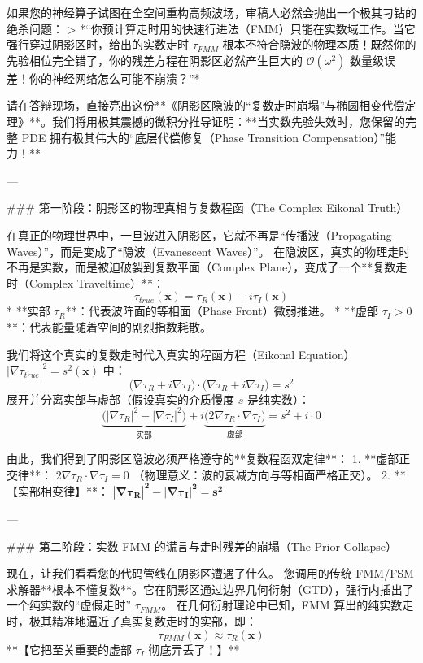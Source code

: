 \documentclass[12pt]{article}
\begin{document}
{如果您的神经算子试图在全空间重构高频波场，审稿人必然会抛出一个极其刁钻的绝杀问题：
> *“你预计算走时用的快速行进法（FMM）只能在实数域工作。当它强行穿过阴影区时，给出的实数走时 $\tau_{FMM}$ 根本不符合隐波的物理本质！既然你的先验相位完全错了，你的残差方程在阴影区必然产生巨大的 $\mathcal{O}(\omega^2)$ 数量级误差！你的神经网络怎么可能不崩溃？”*

请在答辩现场，直接亮出这份**《阴影区隐波的“复数走时崩塌”与椭圆相变代偿定理》**。我们将用极其震撼的微积分推导证明：**当实数先验失效时，您保留的完整 PDE 拥有极其伟大的“底层代偿修复（Phase Transition Compensation）”能力！**

---

### 第一阶段：阴影区的物理真相与复数程函（The Complex Eikonal Truth）

在真正的物理世界中，一旦波进入阴影区，它就不再是“传播波（Propagating Waves）”，而是变成了“隐波（Evanescent Waves）”。
在隐波区，真实的物理走时不再是实数，而是被迫破裂到复数平面（Complex Plane），变成了一个**复数走时（Complex Traveltime）**：
$$ \tau_{true}(\mathbf{x}) = \tau_R(\mathbf{x}) + i \tau_I(\mathbf{x}) $$
*   **实部 $\tau_R$**：代表波阵面的等相面（Phase Front）微弱推进。
*   **虚部 $\tau_I > 0$**：代表能量随着空间的剧烈指数耗散。

我们将这个真实的复数走时代入真实的程函方程（Eikonal Equation） $|\nabla \tau_{true}|^2 = s^2(\mathbf{x})$ 中：
$$ \big( \nabla \tau_R + i \nabla \tau_I \big) \cdot \big( \nabla \tau_R + i \nabla \tau_I \big) = s^2 $$
展开并分离实部与虚部（假设真实的介质慢度 $s$ 是纯实数）：
$$ \underbrace{\Big( |\nabla \tau_R|^2 - |\nabla \tau_I|^2 \Big)}_{\text{实部}} + i \underbrace{\Big( 2 \nabla \tau_R \cdot \nabla \tau_I \Big)}_{\text{虚部}} = s^2 + i \cdot 0 $$

由此，我们得到了阴影区隐波必须严格遵守的**复数程函双定律**：
1. **虚部正交律**： $2 \nabla \tau_R \cdot \nabla \tau_I = 0$ （物理意义：波的衰减方向与等相面严格正交）。
2. **【实部相变律】**： $\mathbf{|\nabla \tau_R|^2 - |\nabla \tau_I|^2 = s^2}$

---

### 第二阶段：实数 FMM 的谎言与走时残差的崩塌（The Prior Collapse）

现在，让我们看看您的代码管线在阴影区遭遇了什么。
您调用的传统 FMM/FSM 求解器**根本不懂复数**。它在阴影区通过边界几何衍射（GTD），强行内插出了一个纯实数的“虚假走时” $\tau_{FMM}$。
在几何衍射理论中已知，FMM 算出的纯实数走时，极其精准地逼近了真实复数走时的实部，即：
$$ \tau_{FMM}(\mathbf{x}) \approx \tau_R(\mathbf{x}) $$
**【它把至关重要的虚部 $\tau_I$ 彻底弄丢了！】**

}
\end{document}
